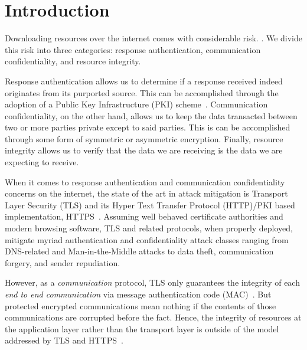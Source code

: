 \section{Introduction} \label{sec:introduction}


 Downloading resources over the internet comes with
considerable risk. . We divide this risk into three
categories: response authentication, communication confidentiality, and resource
integrity.

Response authentication allows us to determine if a response received indeed
originates from its purported source. This can be accomplished through the
adoption of a Public Key Infrastructure (PKI) scheme~\cite{PKI}. Communication
confidentiality, on the other hand, allows us to keep the data transacted
between two or more parties private except to said parties. This is can be
accomplished through some form of symmetric or asymmetric encryption. Finally,
resource integrity allows us to verify that the data we are receiving is the
data we are expecting to receive.


When it comes to response authentication and communication confidentiality
concerns on the internet, the state of the art in attack mitigation is Transport
Layer Security (TLS) and its Hyper Text Transfer Protocol (HTTP)/PKI based
implementation, HTTPS~\cite{TLS1.2, TLS1, TLS0, HTTPS, PKI}. Assuming well behaved
certificate authorities and modern browsing software, TLS and related protocols,
when properly deployed, mitigate myriad authentication and confidentiality
attack classes ranging from DNS-related and Man-in-the-Middle attacks to data
theft, communication forgery, and sender repudiation.

However, as a \textit{communication} protocol, TLS only guarantees the integrity
of each \textit{end to end communication} via message authentication code
(MAC)~\cite{TLS1.2}. But protected encrypted communications mean nothing if the
contents of those communications are corrupted before the fact. Hence, the
integrity of resources at the application layer rather than the transport layer
is outside of the model addressed by TLS and HTTPS~\cite{TLS1.2, HTTPS}.

